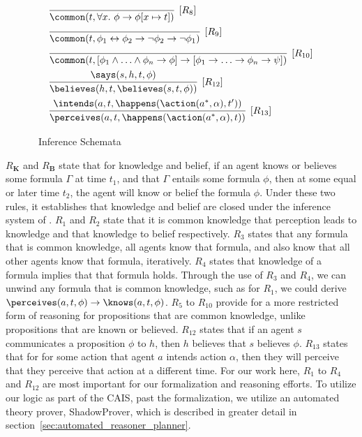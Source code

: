 \begin{figure}[h]
\begin{mdframed}[nobreak=true, roundcorner=8pt, frametitlealignment=\centering]
\begin{equation*}
\begin{aligned}
& \infer[{[R_8]}]{\common(t, \forall x. \  \phi \lif \phi[x\mapsto
  t])}{} \\
& \infer[{[R_9]}]{\common(t,\phi_1 \liff \phi_2 \lif \neg
    \phi_2 \lif \neg \phi_1)}{}\\
& \infer[{[R_{10}]}] {\common(t,[\phi_1\land\ldots\land\phi_n\lif\phi]
  \lif [\phi_1\lif\ldots\lif\phi_n\lif\psi])}{}\\
& \infer[{[R_{12}]}]{\believes(h,t,\believes(s,t,\phi))}{\says(s,h,t,\phi)} \\
& \infer[{[R_{13}]}]{\perceives(a,t,\happens(\action(a^\ast,\alpha),t))}{\intends(a,t,\happens(\action(a^\ast,\alpha),t'))}
\end{aligned}
\end{equation*}
\end{mdframed}
\caption{\CEC\ Inference Schemata}
\label{fig:cec_schemata}
\end{figure}

$R_\mathbf{K}$ and $R_\mathbf{B}$ state that for knowledge and belief, if an
agent knows or believes some formula $\Gamma$ at time $t_{1}$, and that $\Gamma$
entails some formula $\phi$, then at some equal or later time $t_{2}$, the
agent will know or belief the formula $\phi$. Under these two rules, it
establishes that knowledge and belief are closed under the inference system of
\CEC. $R_{1}$ and $R_{2}$ state that it is common knowledge that perception
leads to knowledge and that knowledge to belief respectively. $R_{3}$ states that
any formula that is common knowledge, all agents know that formula, and also know
that all other agents know that formula, iteratively. $R_{4}$ states that
knowledge  of a formula implies that that formula holds. Through the use of
$R_{3}$ and $R_{4}$, we can unwind any formula that is common knowledge, such
as for $R_1$, we could derive
$\perceives(a, t, \phi) \rightarrow \knows(a, t, \phi)$. $R_5$ to $R_{10}$
provide for a more restricted form of reasoning for propositions that are common
knowledge, unlike propositions that are known or believed.  $R_{12}$
states that if an agent $s$ communicates a proposition $\phi$ to $h$,
then $h$ believes that $s$ believes $\phi$. $R_{13}$ states that for for some
action that agent $a$ intends action $\alpha$, then they will perceive that they
perceive that action at a different time. For our work here, $R_{1}$ to $R_{4}$
and $R_{12}$ are most important for our formalization and reasoning efforts.
To utilize our logic as part of the CAIS, past the formalization, we utilize
an automated theory prover, \textsf{ShadowProver}, which is described in greater
detail in section~\ref{sec:automated_reasoner_planner}.

